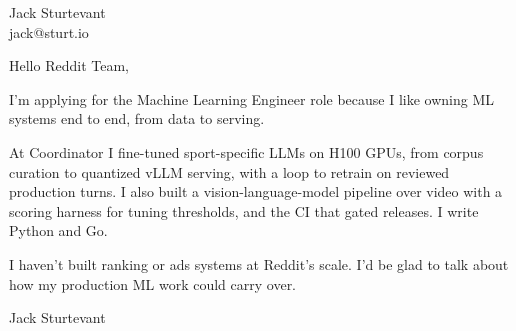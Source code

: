 \documentclass[11pt]{article}
\begin{document}
\raggedright

{\namefont\fontsize{20pt}{24pt}\selectfont Jack Sturtevant}\\[-0.3em]
jack@sturt.io

\vspace{1.2em}

Hello Reddit Team,

I'm applying for the Machine Learning Engineer role because I like owning ML systems end to end, from data to serving.

At Coordinator I fine-tuned sport-specific LLMs on H100 GPUs, from corpus curation to quantized vLLM serving, with a loop to retrain on reviewed production turns. I also built a vision-language-model pipeline over video with a scoring harness for tuning thresholds, and the CI that gated releases. I write Python and Go.

I haven't built ranking or ads systems at Reddit's scale. I'd be glad to talk about how my production ML work could carry over.

\vspace{0.6em}
Jack Sturtevant
\end{document}
